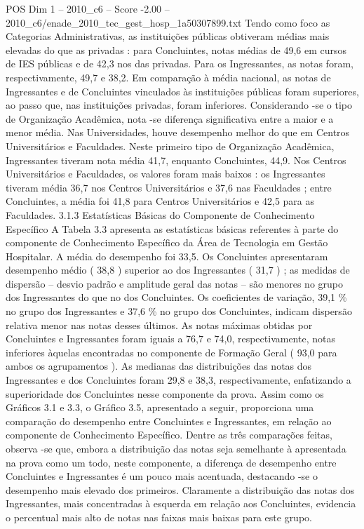 \begin{textsample}{POS Dim 1 – 2010\_c6 – Score -2.00 – 2010\_c6/enade\_2010\_tec\_gest\_hosp\_1a50307899.txt}
Tendo como foco as Categorias Administrativas, as instituições públicas obtiveram médias mais elevadas do que as privadas : para Concluintes, notas médias de 49,6 em cursos de IES públicas e de 42,3 nos das privadas.
Para os Ingressantes, as notas foram, respectivamente, 49,7 e 38,2.
Em comparação à média nacional, as notas de Ingressantes e de Concluintes vinculados às instituições públicas foram superiores, ao passo que, nas instituições privadas, foram inferiores.
Considerando -se o tipo de Organização Acadêmica, nota -se diferença significativa entre a maior e a menor média.
Nas Universidades, houve desempenho melhor do que em Centros Universitários e Faculdades.
Neste primeiro tipo de Organização Acadêmica, Ingressantes tiveram nota média 41,7, enquanto Concluintes, 44,9.
Nos Centros Universitários e Faculdades, os valores foram mais baixos : os Ingressantes tiveram média 36,7 nos Centros Universitários e 37,6 nas Faculdades ; entre Concluintes, a média foi 41,8 para Centros Universitários e 42,5 para as Faculdades. 3.1.3 Estatísticas Básicas do Componente de Conhecimento Específico A Tabela 3.3 apresenta as estatísticas básicas referentes à parte do componente de Conhecimento Específico da Área de Tecnologia em Gestão Hospitalar.
A média do desempenho foi 33,5.
Os Concluintes apresentaram desempenho médio ( 38,8 ) superior ao dos Ingressantes ( 31,7 ) ; as medidas de dispersão – desvio padrão e amplitude geral das notas – são menores no grupo dos Ingressantes do que no dos Concluintes.
Os coeficientes de variação, 39,1 \% no grupo dos Ingressantes e 37,6 \% no grupo dos Concluintes, indicam dispersão relativa menor nas notas desses últimos.
As notas máximas obtidas por Concluintes e Ingressantes foram iguais a 76,7 e 74,0, respectivamente, notas inferiores àquelas encontradas no componente de Formação Geral ( 93,0 para ambos os agrupamentos ).
As medianas das distribuições das notas dos Ingressantes e dos Concluintes foram 29,8 e 38,3, respectivamente, enfatizando a superioridade dos Concluintes nesse componente da prova.
Assim como os Gráficos 3.1 e 3.3, o Gráfico 3.5, apresentado a seguir, proporciona uma comparação do desempenho entre Concluintes e Ingressantes, em relação ao componente de Conhecimento Específico.
Dentre as três comparações feitas, observa -se que, embora a distribuição das notas seja semelhante à apresentada na prova como um todo, neste componente, a diferença de desempenho entre Concluintes e Ingressantes é um pouco mais acentuada, destacando -se o desempenho mais elevado dos primeiros.
Claramente a distribuição das notas dos Ingressantes, mais concentradas à esquerda em relação aos Concluintes, evidencia o percentual mais alto de notas nas faixas mais baixas para este grupo.

\end{textsample}
